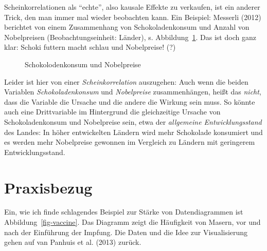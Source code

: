 \documentclass[
  letterpaper,
]{scrbook}
\theoremstyle{definition}
\theoremstyle{definition}
\theoremstyle{definition}
\theoremstyle{remark}
\begin{document}
Scheinkorrelationen als \enquote{echte}, also kausale Effekte zu
verkaufen, ist ein anderer Trick, den man immer mal wieder beobachten
kann. Ein Beispiel: Messerli (2012) berichtet von einem Zusammenhang von
Schokoladenkonsum und Anzahl von Nobelpreisen (Beobachtungseinheit:
Länder), s. Abbildung~\ref{fig-choc}. Das ist doch ganz klar: Schoki
futtern macht schlau und Nobelpreise! (?)

\begin{figure}


\caption{\label{fig-choc}Schokolodenkonsum und Nobelpreise}

\end{figure}%

Leider ist hier von einer \emph{Scheinkorrelation} auszugehen: Auch wenn
die beiden Variablen \emph{Schokoladenkonsum} und \emph{Nobelpreise}
zusammenhängen, heißt das \emph{nicht}, dass die Variable die Ursache
und die andere die Wirkung sein muss. So könnte auch eine Drittvariable
im Hintergrund die gleichzeitige Ursache von Schokoladenkonsum und
Nobelpreise sein, etwa der \emph{allgemeine Entwicklungsstand} des
Landes: In höher entwickelten Ländern wird mehr Schokolade konsumiert
und es werden mehr Nobelpreise gewonnen im Vergleich zu Ländern mit
geringerem Entwicklungsstand.

\section{Praxisbezug}\label{praxisbezug-3}

Ein, wie ich finde schlagendes Beispiel zur Stärke von Datendiagrammen
ist Abbildung~\ref{fig-vaccine}. Das Diagramm zeigt die Häufigkeit von
Masern, vor und nach der Einführung der Impfung. Die Daten und die Idee
zur Visualisierung gehen auf van Panhuis et al. (2013) zurück.
\end{document}
